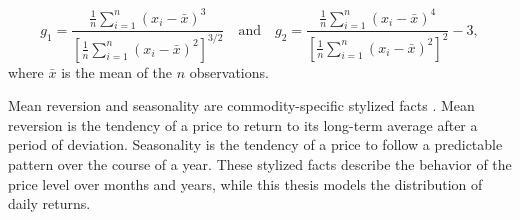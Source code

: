 \begin{equation}
g_1 = \frac{\frac{1}{n} \sum_{i=1}^{n} (x_i - \bar{x})^3}
           {\left[ \frac{1}{n} \sum_{i=1}^{n} (x_i - \bar{x})^2 \right]^{3/2}}
\quad \text{and} \quad
g_2 = \frac{\frac{1}{n} \sum_{i=1}^{n} (x_i - \bar{x})^4}
           {\left[ \frac{1}{n} \sum_{i=1}^{n} (x_i - \bar{x})^2 \right]^{2}} - 3,
\label{eq:g1-g2}
\end{equation}
where $\bar{x}$ is the mean of the $n$ observations.


Mean reversion and seasonality are commodity-specific stylized facts \parencite[64--68]{gemanCommoditiesCommodityDerivatives2006}. Mean reversion is the tendency of a price to return to its long-term average after a period of deviation. Seasonality is the tendency of a price to follow a predictable pattern over the course of a year. These stylized facts describe the behavior of the price level over months and years, while this thesis models the distribution of daily returns. 
